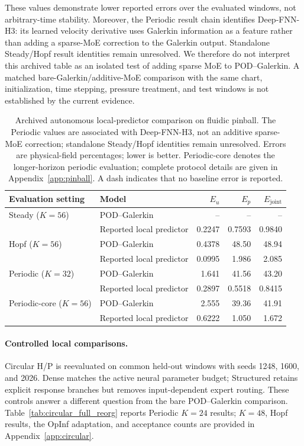 These values demonstrate lower reported errors over the evaluated
windows, not arbitrary-time stability. Moreover, the Periodic
result chain identifies Deep-FNN-H3: its learned velocity derivative
uses Galerkin information as a feature rather than adding a
sparse-MoE correction to the Galerkin output.
Standalone Steady/Hopf result identities remain unresolved.
We therefore do not interpret this archived table as an isolated
test of adding sparse MoE to POD--Galerkin.
A matched bare-Galerkin/additive-MoE comparison with the same chart,
initialization, time stepping, pressure treatment, and test windows
is not established by the current evidence.

\begin{table}[H]
\centering
\caption{
Archived autonomous local-predictor comparison on fluidic pinball. The Periodic values are associated with Deep-FNN-H3, not an additive sparse-MoE correction; standalone Steady/Hopf identities remain unresolved. Errors are physical-field percentages; lower is better. Periodic-core denotes the longer-horizon periodic evaluation; complete protocol details are given in Appendix~\ref{app:pinball}. A dash indicates that no baseline error is reported.
}
\label{tab:pinball_autonomous}
\small
\setlength{\tabcolsep}{5pt}
\begin{tabular}{@{}llrrr@{}}
\toprule
Evaluation setting & Model & $E_u$ & $E_p$ & $E_{\mathrm{joint}}$ \\
\midrule
Steady ($K=56$)
& POD--Galerkin
& -- & -- & -- \\
& Reported local predictor
& 0.2247 & 0.7593 & 0.9840 \\
\addlinespace

Hopf ($K=56$)
& POD--Galerkin
& 0.4378 & 48.50 & 48.94 \\
& Reported local predictor
& 0.0995 & 1.986 & 2.085 \\
\addlinespace

Periodic ($K=32$)
& POD--Galerkin
& 1.641 & 41.56 & 43.20 \\
& Reported local predictor
& 0.2897 & 0.5518 & 0.8415 \\
\addlinespace

Periodic-core ($K=56$)
& POD--Galerkin
& 2.555 & 39.36 & 41.91 \\
& Reported local predictor
& 0.6222 & 1.050 & 1.672 \\
\bottomrule
\end{tabular}
\end{table}

\paragraph{Controlled local comparisons.}
Circular H/P is reevaluated on common held-out windows with seeds
1248, 1600, and 2026. Dense matches the active neural parameter
budget; Structured retains explicit response branches but removes
input-dependent expert routing. These controls answer a different
question from the bare POD--Galerkin comparison.
Table~\ref{tab:circular_full_reorg} reports Periodic $K=24$ results;
$K=48$, Hopf results, the OpInf adaptation, and acceptance counts
are provided in Appendix~\ref{app:circular}.

